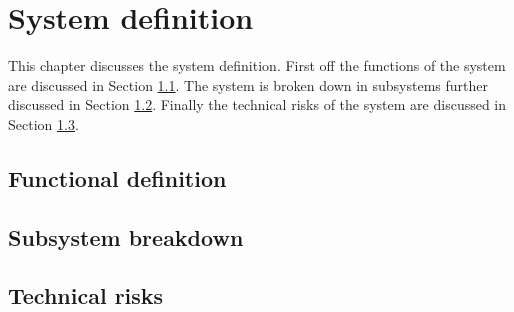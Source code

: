 \section{System definition}\label{cha:sysdef}

This chapter discusses the system definition. First off the functions of the system are discussed in Section \ref{sec:funcdef}. The system is broken down in subsystems further discussed in Section \ref{sec:subsysbreak}. Finally the technical risks of the system are discussed in Section \ref{sec:sysrisk}.


\subsection{Functional definition} \label{sec:funcdef}


\subsection{Subsystem breakdown} \label{sec:subsysbreak}


\subsection{Technical risks} \label{sec:sysrisk}

